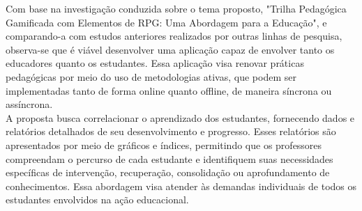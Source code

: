 Com base na investigação conduzida sobre o tema proposto, "Trilha Pedagógica Gamificada com Elementos de RPG: Uma Abordagem para a Educação", e comparando-a com estudos anteriores realizados por outras linhas de pesquisa, observa-se que é viável desenvolver uma aplicação capaz de envolver tanto os educadores quanto os estudantes. Essa aplicação visa renovar práticas pedagógicas por meio do uso de metodologias ativas, que podem ser implementadas tanto de forma online quanto offline, de maneira síncrona ou assíncrona. 
\\

A proposta busca correlacionar o aprendizado dos estudantes, fornecendo dados e relatórios detalhados de seu desenvolvimento e progresso. Esses relatórios são apresentados por meio de gráficos e índices, permitindo que os professores compreendam o percurso de cada estudante e identifiquem suas necessidades específicas de intervenção, recuperação, consolidação ou aprofundamento de conhecimentos. Essa abordagem visa atender às demandas individuais de todos os estudantes envolvidos na ação educacional. 
\\




